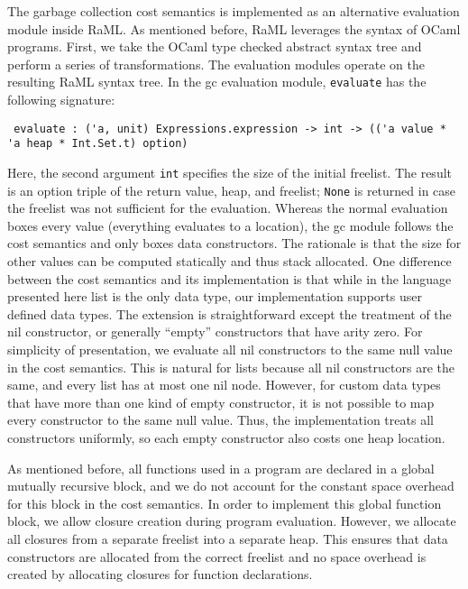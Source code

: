 \documentclass{easychair}
\theoremstyle{definition}
\begin{document}
The garbage collection cost semantics is implemented as an alternative evaluation module inside
RaML. As mentioned before, RaML leverages the syntax of OCaml programs.
First, we take the OCaml type checked abstract syntax tree and perform a series of transformations. 
The evaluation modules operate on the resulting RaML syntax tree. 
In the gc evaluation module, \texttt{evaluate} has the following signature:
{\small%
\begin{verbatim}
 evaluate : ('a, unit) Expressions.expression -> int -> (('a value * 'a heap * Int.Set.t) option) 
\end{verbatim}
}
Here, the second argument \texttt{int} specifies the size of the initial freelist.
The result is an option triple of the return value, heap, and freelist; \texttt{None} is returned
in case the freelist was not sufficient for the evaluation.
Whereas the normal evaluation boxes every value (everything evaluates to a location), 
the gc module follows the cost semantics and only boxes data constructors. The rationale is
that the size for other values can be computed statically and thus stack allocated. One difference
between the cost semantics and its implementation is that while in the language presented here
list is the only data type, our implementation supports user defined data types. The extension
is straightforward except the treatment of the nil constructor, or generally ``empty'' constructors
that have arity zero. For simplicity of presentation, we evaluate all nil constructors to
the same null value in the cost semantics. This is natural for lists because all nil constructors 
are the same, and every list has at most one nil node. However, for custom data types that have 
more than one kind of empty constructor, it is not possible to map every constructor to the same 
null value. Thus, the implementation treats all constructors uniformly, so each empty constructor
also costs one heap location. 

As mentioned before, all functions used in a program are declared in a global mutually 
recursive block, and we do not account for the constant space overhead for this block in 
the cost semantics.  In order to implement this global function block, we allow closure creation
during program evaluation. However, we allocate all closures from a separate freelist into 
a separate heap.  This ensures that data constructors are allocated from the correct freelist 
and no space overhead is created by allocating closures for function declarations.
\end{document}
